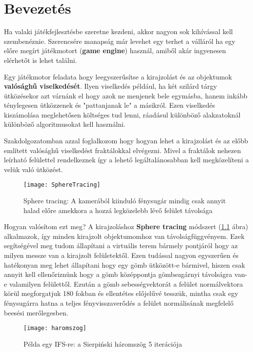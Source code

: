 \chapter{Bevezetés} %
\label{ch:intro}

Ha valaki játékfejlesztésbe szeretne kezdeni, akkor nagyon sok kihívással kell szembenéznie. Szerencsére manapság már levehet egy terhet a válláról ha egy előre megírt játékmotort (\textbf{game engine}) használ, amiből akár ingyenesen elérhetőt is lehet találni.

Egy játékmotor feladata hogy leegyszerűsítse a kirajzolást és az objektumok \textbf{valósághű viselkedését}. Ilyen viselkedés például, ha két szilárd tárgy ütközésekor azt várnánk el hogy azok ne menjenek bele egymásba, hanem inkább ténylegesen ütközzenek és "pattanjanak le" a másikról. Ezen viselkedés kiszámolása meglehetősen költséges tud lenni, ráadásul különböző alakzatoknál különböző algoritmusokat kell használni.

Szakdolgozatomban azzal foglalkozom hogy hogyan lehet a kirajzolást és az előbb említett valósághű viselkedést fraktálokkal elvégezni. Mivel a fraktálok nehezen leírható felülettel rendelkeznek így a lehető legáltalánosabban kell megközelíteni a velük való ütközést. 


\begin{figure}[H]
	\centering
	\texttt{[image: SphereTracing]}
	\caption{Sphere tracing: A kamerából kiinduló fénysugár mindig csak annyit halad előre amekkora a hozzá legközelebb lévő felület távolsága}
	\label{fig:SphereTracing}
\end{figure}

Hogyan valósítom ezt meg? A kirajzoláshoz \textbf{Sphere tracing} módszert (\ref{fig:SphereTracing} ábra) alkalmazok, így minden kirajzolt objektumomhoz van távolságfüggvényem. Ezek segítségével meg tudom állapítani a virtuális terem bármely pontjáról hogy az milyen messze van a kirajzolt felületektől. Ezen tudással nagyon egyszerűen és hatékonyan meg lehet állapítani hogy egy gömb ütközött-e bármivel, hiszen csak annyit kell ellenőriznünk hogy a gömb középpontja gömbsugárnyi távolságra van-e valamilyen felülettől. Ezután a gömb sebességvektorát a felület normálvektora körül megforgatjuk 180 fokban és ellentétes előjelűvé tesszük, mintha csak egy fénysugárra hatna a teljes fényvisszaverődés a felület normálisának megfelelő beesési merőlegesben.

\begin{figure}[H]
	\centering
	\texttt{[image: haromszog]}
	\caption{Példa egy IFS-re: a Sierpiński háromszög 5 iterációja}
	\label{fig:Ifs}
\end{figure}

